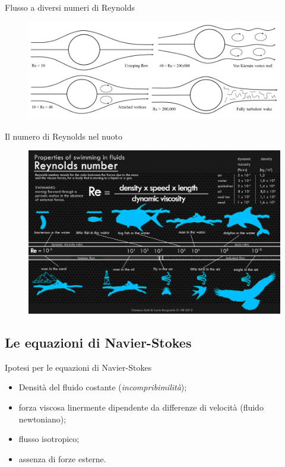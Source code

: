 \documentclass[11pt]{beamer}
\begin{document}
\begin{frame}{Flusso a diversi numeri di Reynolds}
\begin{figure}
\centering
\includegraphics[scale=0.4]{flow_cylinder_6.png}
\end{figure}
\end{frame}

\begin{frame}{Il numero di Reynolds nel nuoto}
\begin{figure}
\centering
\includegraphics[scale=0.12]{infographic.jpg}
\end{figure}
\end{frame}

\subsection{Le equazioni di Navier-Stokes}

\begin{frame}{Ipotesi per le equazioni di Navier-Stokes}
\begin{itemize}
\item Densità del fluido costante (\emph{incompribimilità});
\item forza viscosa linermente dipendente da differenze di velocità (fluido newtoniano);
\item flusso isotropico;
\item assenza di forze esterne.
\end{itemize}
\end{frame}
\end{document}

